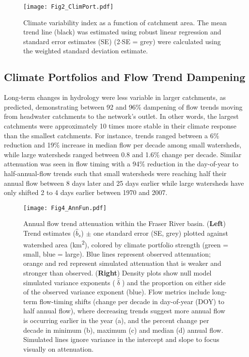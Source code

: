 \documentclass[draft,linenumbers]{AGUJournal}
\begin{document}
\begin{figure}[h]
\centering
\texttt{[image: Fig2\_ClimPort.pdf]}
	\caption{Climate variability index as a function of catchment area. The mean trend line (black) was estimated using robust linear regression and standard error estimates (SE) (2$\cdot$SE = grey) were calculated using the weighted standard deviation estimate.}
\label{fig:2}
\end{figure}

\subsection{Climate Portfolios and Flow Trend Dampening}

Long-term changes in hydrology were less variable in larger catchments, as predicted, demonstrating between 92 and 96\% dampening of flow trends moving from headwater catchments to the network's outlet. In other words, the largest catchments were approximately 10 times more stable in their climate response than the smallest catchments. For instance, trends ranged between a 6\% reduction and 19\% increase in median flow per decade among small watersheds, while large watersheds ranged between 0.8 and 1.6\% change per decade. Similar attenuation was seen in flow timing with a 94\% reduction in the day-of-year to half-annual-flow trends such that small watersheds were reaching half their annual flow between 8 days later and 25 days earlier while large watersheds have only shifted 2 to 4 days earlier between 1970 and 2007.

\begin{figure}[h]
\centering
\texttt{[image: Fig4\_AnnFun.pdf]}
	\caption{Annual flow trend attenuation within the Fraser River basin. (\textbf{Left}) Trend estimates ($\hat{b}_{s}$) $\pm$ one standard error (SE, grey) plotted against watershed area (km\textsuperscript{2}), colored by climate portfolio strength (green = small, blue = large). Blue lines represent observed attenuation; orange and red represent simulated attenuation that is weaker and stronger than observed. (\textbf{Right}) Density plots show null model simulated variance exponents ($\hat{\updelta}$) and the proportion on either side of the observed variance exponent (blue). Flow metrics include long-term flow-timing shifts (change per decade in day-of-year (DOY) to half annual flow), where decreasing trends suggest more annual flow is occurring earlier in the year (a), and the percent change per decade in minimum (b), maximum (c) and median (d) annual flow. Simulated lines ignore variance in the intercept and slope to focus visually on attenuation.}
\label{fig:3}
\end{figure}
\end{document}
